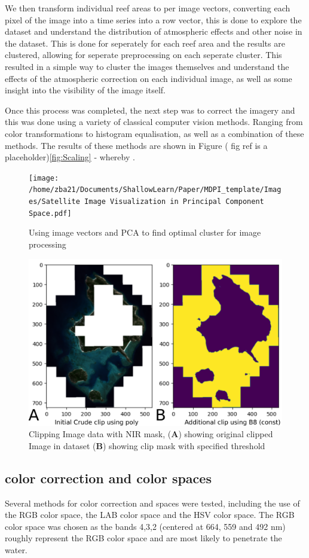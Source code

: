 \documentclass[journal,article,submit,pdftex,moreauthors]{Definitions/mdpi}
\begin{document}
We then transform individual reef areas to per image vectors, converting each pixel of the image into a time series into a row vector, this is done to explore the dataset and understand the distribution of 
atmospheric effects and other noise in the dataset. This is done for seperately for each reef area and the results are clustered, allowing for seperate preprocessing
on each seperate cluster. This resulted in a simple way to cluster the images themselves and understand the effects of the atmospheric correction on each individual image, as well as some insight into
the visibility of the image itself. 



Once this process was completed, the next step was to correct the imagery and this was done using a variety of classical computer vision methods. Ranging from color transformations to 
histogram equalisation, as well as a combination of these methods. The results of these methods are shown in Figure ( fig ref is a placeholder)\ref{fig:Scaling} - whereby .

\begin{figure}
	\centering
	\texttt{[image: /home/zba21/Documents/ShallowLearn/Paper/MDPI\_template/Images/Satellite Image Visualization in Principal Component Space.pdf]}
	\caption{Using image vectors and PCA to find optimal cluster for image processing}
	\label{fig:PCA_Images}
\end{figure}


\begin{figure}
	\centering
	\includegraphics[width=0.7\linewidth]{Images/Preproc_Workflow.pdf}
	\caption{Clipping Image data with NIR mask, (\textbf{A}) showing original clipped Image in dataset (\textbf{B}) showing clip mask with specified threshold}
	\label{fig:PreprocWorkflow}
\end{figure}

\subsection*{color correction and color spaces}
Several methods for color correction and spaces were tested, including the use of the RGB color space, the LAB color space and the HSV color space. 
The RGB color space was chosen as the bands 4,3,2 (centered at 664, 559 and 492 nm) roughly represent the RGB color space and are most likely to penetrate the water.
\end{document}
